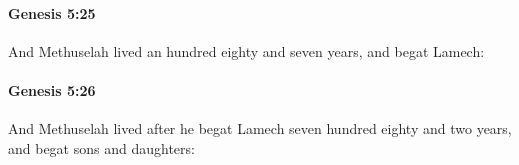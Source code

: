 		\paragraph{Genesis 5:25} %
			\label{GENESIS-5-25}

			And Methuselah lived an hundred eighty and seven years, and begat Lamech:


		\paragraph{Genesis 5:26} %
			\label{GENESIS-5-26}

			And Methuselah lived after he begat Lamech seven hundred eighty and two years, and begat sons and daughters:


